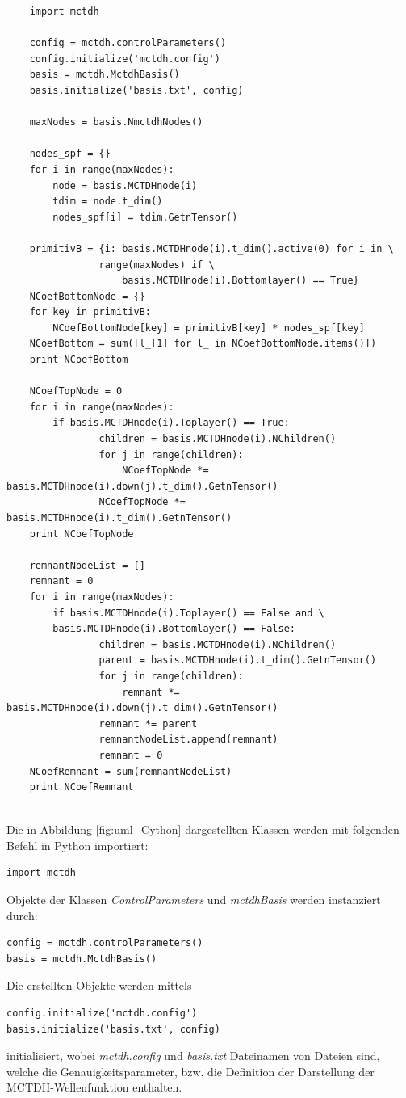 \begin{verbatim}
    import mctdh

    config = mctdh.controlParameters()
    config.initialize('mctdh.config')
    basis = mctdh.MctdhBasis()
    basis.initialize('basis.txt', config)
    
    maxNodes = basis.NmctdhNodes()
    
    nodes_spf = {}
    for i in range(maxNodes):
        node = basis.MCTDHnode(i)
        tdim = node.t_dim()
        nodes_spf[i] = tdim.GetnTensor() 
    
    primitivB = {i: basis.MCTDHnode(i).t_dim().active(0) for i in \
                range(maxNodes) if \
                    basis.MCTDHnode(i).Bottomlayer() == True}
    NCoefBottomNode = {}
    for key in primitivB:
        NCoefBottomNode[key] = primitivB[key] * nodes_spf[key]
    NCoefBottom = sum([l_[1] for l_ in NCoefBottomNode.items()])
    print NCoefBottom

    NCoefTopNode = 0
    for i in range(maxNodes):
        if basis.MCTDHnode(i).Toplayer() == True:
                children = basis.MCTDHnode(i).NChildren()
                for j in range(children):
                    NCoefTopNode *= basis.MCTDHnode(i).down(j).t_dim().GetnTensor()
                NCoefTopNode *= basis.MCTDHnode(i).t_dim().GetnTensor()
    print NCoefTopNode
    
    remnantNodeList = []
    remnant = 0
    for i in range(maxNodes):
        if basis.MCTDHnode(i).Toplayer() == False and \
        basis.MCTDHnode(i).Bottomlayer() == False:
                children = basis.MCTDHnode(i).NChildren()
                parent = basis.MCTDHnode(i).t_dim().GetnTensor()
                for j in range(children):
                    remnant *= basis.MCTDHnode(i).down(j).t_dim().GetnTensor() 
                remnant *= parent
                remnantNodeList.append(remnant)
                remnant = 0
    NCoefRemnant = sum(remnantNodeList)
    print NCoefRemnant
    
\end{verbatim}

Die in Abbildung \ref{fig:uml_Cython} dargestellten Klassen werden mit folgenden Befehl in Python importiert:

\begin{verbatim}
import mctdh
\end{verbatim}
Objekte der Klassen \textit{ControlParameters} und \textit{mctdhBasis} werden instanziert durch:
\begin{verbatim}
config = mctdh.controlParameters()
basis = mctdh.MctdhBasis()
\end{verbatim}
Die erstellten Objekte werden mittels
\begin{verbatim}
config.initialize('mctdh.config')
basis.initialize('basis.txt', config)
\end{verbatim}
initialisiert, wobei \textit{mctdh.config} und \textit{basis.txt} Dateinamen von Dateien sind, 
welche die Genauigkeitsparameter, bzw. die Definition der Darstellung der MCTDH-Wellenfunktion enthalten.

